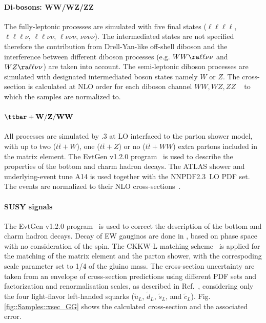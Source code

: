 \paragraph{Di-bosons: WW/WZ/ZZ}
The fully-leptonic processes are simulated with five final states ($\ell\ell\ell\ell$, $\ell\ell\ell\nu$, $\ell\ell\nu\nu$, $\ell\nu\nu\nu$, $\nu\nu\nu\nu$). The intermediated states are not specified therefore the contribution from Drell-Yan-like off-shell diboson and the interference between different diboson processes (e.g. $WW\ra\ell\ell\nu\nu$ and $WZ\ra\ell\ell\nu\nu$) are taken into account. The semi-leptonic diboson processes are simulated with designated intermediated boson states namely $W$ or $Z$.
The cross-section is calculated at NLO order for each diboson channel $WW,WZ,ZZ$ ~ to which the samples are normalized to.


\paragraph{${\bf \ttbar+W/Z/WW}$}
All processes are simulated by .3 at LO interfaced to the  parton shower model, 
with up to two ($t\bar{t}+W$), one ($t\bar{t}+Z$) or no ($t\bar{t}+WW$) extra partons included in the matrix element. 
The EvtGen v1.2.0 program~\cite{EvtGen} is used to describe the properties of the bottom and charm hadron decays. 
The ATLAS shower and underlying-event tune A14 is used together with the NNPDF2.3~LO PDF set. 
The events are normalized to their NLO cross-sections~.


\paragraph{SUSY signals} \label{sec::Samples::SUSY}
The EvtGen v1.2.0 program~\cite{EvtGen} is used to correct the description of the bottom and charm hadron decays. 
Decay of EW gauginos are done in \pythia , based on phase space with no consideration of the spin.
The CKKW-L matching scheme~\cite{CKKW} is applied for the matching of the matrix element and the parton shower, with the correspoding scale parameter set to 1/4 of the gluino mass. 
The cross-section uncertainty are taken from an envelope of cross-section predictions using different PDF sets and factorization and renormalisation scales, as described in Ref.~\cite{Borschensky:2014cia}, considering only the four light-flavor left-handed squarks ($\tilde{u}_L$, $\tilde{d}_L$, $\tilde{s}_L$, and $\tilde{c}_L$). Fig. \ref{fig::Samples::xsec_GG} shows the calculated cross-section and the associated error. \\


